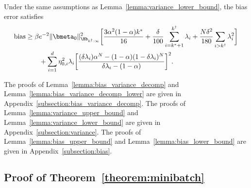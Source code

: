 \documentclass[11pt]{article}
\begin{document}
\begin{lemma}\label{lemma:bias_lower_bound}
Under the same assumptions as Lemma~\ref{lemma:variance_lower_bound}, the bias error satisfies
\begin{align*}
\mathrm{bias}&\ge\beta e^{-2}\|\bmeta_0\|_{\Hb_{k^\dagger:\infty}}^2\bigg[\frac{3\alpha^2(1-\alpha)k^*}{16}+\frac{\delta}{100}\sum_{i=k^*+1}^{k^\dagger}\lambda_i+\frac{N\delta^2}{180}\sum_{i>k^\dagger}\lambda_i^2\bigg]\\
&\qquad+\sum_{i=1}^d\eta_{0, i}^2\lambda_i\bigg[\frac{(\delta\lambda_i)\alpha^N-(1-\alpha)(1-\delta\lambda_i)^N}{\delta\lambda_i-(1-\alpha)}\bigg]^2.
\end{align*}
\end{lemma}

The proofs of Lemma~\ref{lemma:bias_variance_decomp} and Lemma~\ref{lemma:bias_variance_decomp_lower} are given in Appendix~\ref{subsection:bias_variance_decomp}. The proofs of Lemma~\ref{lemma:variance_upper_bound} and Lemma~\ref{lemma:variance_lower_bound} are given in Appendix~\ref{subsection:variance}. The proofs of Lemma~\ref{lemma:bias_upper_bound} and Lemma~\ref{lemma:bias_lower_bound} are given in Appendix~\ref{subsection:bias}.

\subsection{Proof of Theorem~\ref{theorem:minibatch}}\label{subsection:proof_minibatch}
\end{document}

